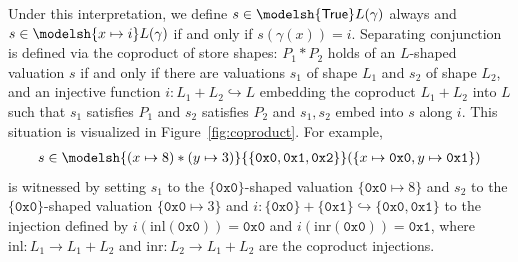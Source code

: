 \documentclass[
  sigconf,
  screen, ]{acmart}
\theoremstyle{definition}
\newcommand\trueprop{\mathsf{True}}
\newcommand\hexnum[1]{\texttt{0x#1}}
\newcommand\inl{\mathrm{inl}}
\newcommand\inr{\mathrm{inr}}
\newcommand\sepcon{\mathbin{*}}
\begin{document}
  Under this interpretation, we define
  $s\in\modelsh{\trueprop}L(\gamma)$ always
  and $s\in\modelsh{x\mapsto i}L(\gamma)$
  if and only if $s(\gamma(x)) = i$.
  Separating conjunction is defined via
  the coproduct of store shapes:
  $P_1\sepcon P_2$
  holds of an $L$-shaped valuation $s$
  if and only if there are valuations
  $s_1$ of shape $L_1$ and $s_2$ of shape $L_2$,
  and an injective function $i : L_1 + L_2\hookrightarrow L$
  embedding the coproduct $L_1+L_2$ into $L$ such that
  $s_1$ satisfies $P_1$ and $s_2$ satisfies $P_2$
  and $s_1,s_2$ embed into $s$ along $i$.
  This situation 
  is visualized in Figure~\ref{fig:coproduct}. For example,
  \begin{align*}
  s \in \modelsh{(x\mapsto 8)\sepcon(y\mapsto 3)}{
    \{\hexnum0,\hexnum1,\hexnum2\}}(\{x\mapsto \hexnum0,
    y\mapsto \hexnum1\})
  \end{align*}
  is witnessed by setting
  $s_1$ to the $\{\hexnum0\}$-shaped valuation
  $\{\hexnum0 \mapsto 8\}$
  and $s_2$ to the $\{\hexnum0\}$-shaped valuation
  $\{ \hexnum0 \mapsto 3\}$
  and $i : \{\hexnum0\}+\{\hexnum1\}\hookrightarrow
  \{\hexnum0,\hexnum1\}$
  to the injection defined by 
  $i(\inl(\hexnum0)) = \hexnum0$
  and $i(\inr(\hexnum0)) = \hexnum1$, where 
  $\inl : L_1 \to L_1 + L_2$ and $\inr : L_2 \to L_1 + L_2$ are the coproduct injections.
\end{document}
